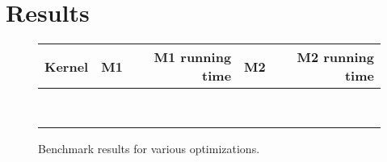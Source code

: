 \section{Results}


\begin{figure}[H]
\centering
\begin{tabular}{ l l r l r }
\textbf{Kernel} & \textbf{M1} & \textbf{M1 running time} & \textbf{M2} & \textbf{M2 running time} \\ \hline
                &             &                         &             & \\
                &             &                         &             & \\
                &             &                         &             & \\
                &             &                         &             & \\
                &             &                         &             & \\
                &             &                         &             & \\
                &             &                         &             & \\
                &             &                         &             & \\
\end{tabular}
\caption{Benchmark results for various optimizations.}
\label{tbl:results}
\end{figure}
